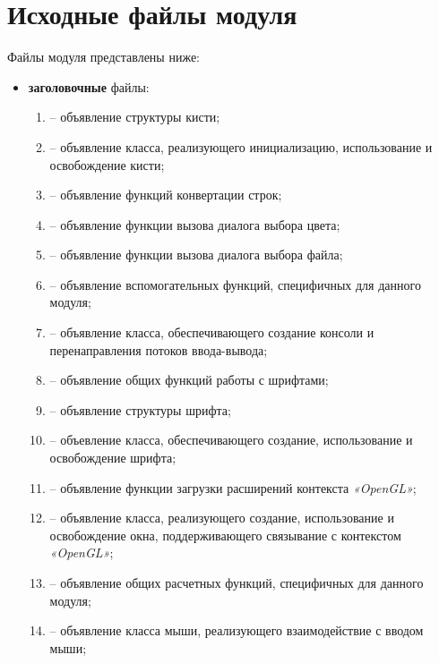 \section{Исходные файлы модуля }

Файлы модуля представлены ниже:

\begin{itemize}[label=---]
    \item \textbf{заголовочные} файлы:
    \begin{enumerate}[label=\arabic*), labelsep=0.5em]
        \item {} -- объявление структуры кисти;
        \item {} -- объявление класса, реализующего инициализацию, использование и освобождение кисти;
        \item {} -- объявление функций конвертации строк;
        \item {} -- объявление функции вызова диалога выбора цвета;
        \item {} -- объявление функции вызова диалога выбора файла;
        \item {} -- объявление вспомогательных функций, специфичных для данного модуля;
        \item {} -- объявление класса, обеспечивающего создание консоли и перенаправления потоков ввода-вывода;
        \item {} -- объявление общих функций работы с шрифтами;
        \item {} -- объявление структуры шрифта;
        \item {} -- объевление класса, обеспечивающего создание, использование и освобождение шрифта;
        \item {} -- объявление функции загрузки расширений контекста \textit{«OpenGL»};
        \item {} -- объявление класса, реализующего создание, использование и освобождение окна, поддерживающего связывание с контекстом \textit{«OpenGL»}; 
        \item {} -- объявление общих расчетных функций, специфичных для данного модуля;
        \item {} -- объявление класса мыши, реализующего взаимодействие с вводом мыши;

\end{enumerate}
\end{itemize}
